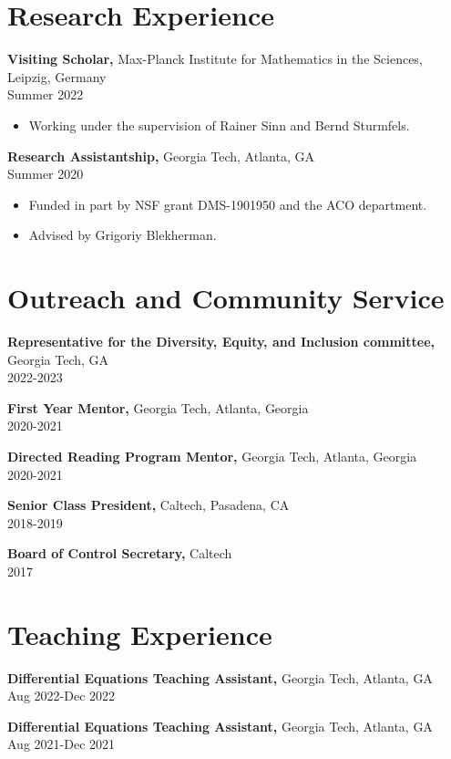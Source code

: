 \documentclass[margin]{res}
\begin{document}
\begin{resume}
\section{Research Experience}
{\bf Visiting Scholar,} Max-Planck Institute for Mathematics in the Sciences, Leipzig, Germany \\ Summer 2022
\begin{itemize} \itemsep -2pt %
\item Working under the supervision of Rainer Sinn and Bernd Sturmfels.
\end{itemize}
{\bf Research Assistantship,} Georgia Tech, Atlanta, GA \\ Summer 2020
\begin{itemize} \itemsep -2pt %
\item Funded in part by NSF grant DMS-1901950 and the ACO department.
\item Advised by Grigoriy Blekherman.
\end{itemize}

\section{Outreach and Community Service} 
       {\bf Representative for the Diversity, Equity, and Inclusion committee,} Georgia Tech, GA    \\         2022-2023

       {\bf First Year Mentor,} Georgia Tech, Atlanta, Georgia     \\         2020-2021 

       {\bf Directed Reading Program Mentor,} Georgia Tech, Atlanta, Georgia     \\         2020-2021 

       {\bf Senior Class President,} Caltech, Pasadena, CA    \\         2018-2019 

		{\bf Board of Control Secretary,} Caltech \\   2017

\section{Teaching Experience}
{\bf Differential Equations Teaching Assistant,} Georgia Tech, Atlanta, GA \\ Aug 2022-Dec 2022

{\bf Differential Equations Teaching Assistant,} Georgia Tech, Atlanta, GA \\ Aug 2021-Dec 2021


\end{resume}
\end{document}
